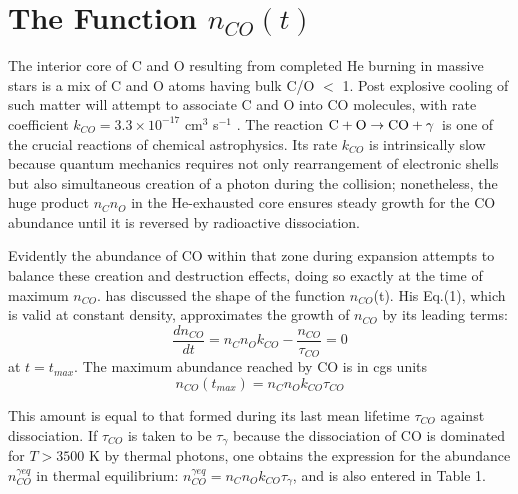 \documentclass[manuscript]{aastex}
\newcommand{\cotoco}{${\rm C} + {\rm O} \to {\rm CO} + \gamma$}
\begin{document}
\section{The Function $n_{CO}(t)$}

The interior core of C and O resulting from completed He burning in massive
stars is a mix of C and O atoms having bulk C/O $<$ 1. Post explosive cooling of
such matter will attempt to associate C and O into CO molecules, with rate
coefficient $k_{CO} = 3.3 \times 10^{-17}$ cm$^3$ s$^{-1}$
\citep{1990ApJ...358..262L}.
The reaction \cotoco\ is one of the crucial reactions of chemical
astrophysics. Its rate $k_{CO}$ is intrinsically slow because quantum mechanics
requires not only rearrangement of electronic shells but also simultaneous
creation of a photon during the collision; nonetheless, the huge product
$n_C n_O$ in the He-exhausted core ensures steady growth for the CO abundance
until it is reversed by radioactive dissociation. 

Evidently the abundance of CO within that zone during expansion attempts to
balance these creation and destruction effects, doing so exactly at the
time of maximum $n_{CO}$. \citet{2013ApJ...762....5C}
has discussed the shape of the function
$n_{CO}$(t). His Eq.(1), which is valid at constant density,
approximates the growth of $n_{CO}$ by its leading terms:
\begin{equation}
\frac{dn_{CO}}{dt} = n_C n_O k_{CO} - \frac{n_{CO}}{\tau_{CO}} = 0
\label{eq:dncodt}
\end{equation}
at $t = t_{max}$.
The maximum abundance reached by CO is in cgs units
\begin{equation}
n_{CO}(t_{max}) = n_C n_O k_{CO} \tau_{CO} 
\label{eq:comax}
\end{equation}

This amount is equal to that formed during its last mean lifetime $\tau_{CO}$
against dissociation. If $\tau_{CO}$ is taken to be $\tau_\gamma$ because
the dissociation of CO is dominated for $T > 3500$ K by thermal photons,
one obtains the expression for the abundance $n_{CO}^{\gamma eq}$ in thermal
equilibrium: $n_{CO}^{\gamma eq} = n_C n_O k_{CO} \tau_\gamma$,
and is also entered in Table 1. 
\end{document}
